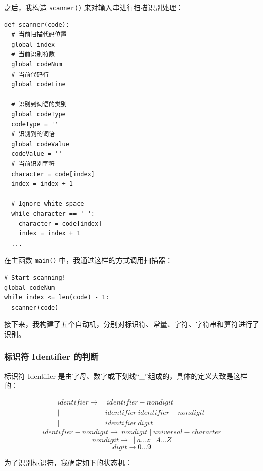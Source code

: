 \documentclass[UTF8]{ctexart}
\begin{document}
之后，我构造 \texttt{scanner()} 来对输入串进行扫描识别处理：

\begin{verbatim}
def scanner(code):
  # 当前扫描代码位置
  global index
  # 当前识别符数
  global codeNum
  # 当前代码行
  global codeLine

  # 识别到词语的类别
  global codeType
  codeType = ''
  # 识别到的词语
  global codeValue
  codeValue = ''
  # 当前识别字符
  character = code[index]
  index = index + 1

  # Ignore white space
  while character == ' ':
    character = code[index]
    index = index + 1
  ...
\end{verbatim}

在主函数 \texttt{main()} 中，我通过这样的方式调用扫描器：

\begin{verbatim}
# Start scanning!
global codeNum
while index <= len(code) - 1:
  scanner(code)
\end{verbatim}

接下来，我构建了五个自动机，分别对标识符、常量、字符、字符串和算符进行了识别。

\subsubsection{标识符 Identifier 的判断}
标识符 Identifier 是由字母、数字或下划线“\_”组成的，具体的定义大致是这样的：

\begin{equation}
\begin{split}
  identifier \rightarrow &\ identifier-nondigit \ \\ |\ & identifier\ identifier-nondigit \ \\ |\ & identifier\ digit
\end{split}
\end{equation}
\begin{equation}
  identifier-nondigit \rightarrow \ nondigit \ |\ universal-character
\end{equation}
\begin{equation}
  nondigit \rightarrow \_ \ |\ a ... z\ |\ A ... Z
\end{equation}
\begin{equation}
  digit \rightarrow 0 ... 9
\end{equation}

为了识别标识符，我确定如下的状态机：
\end{document}
